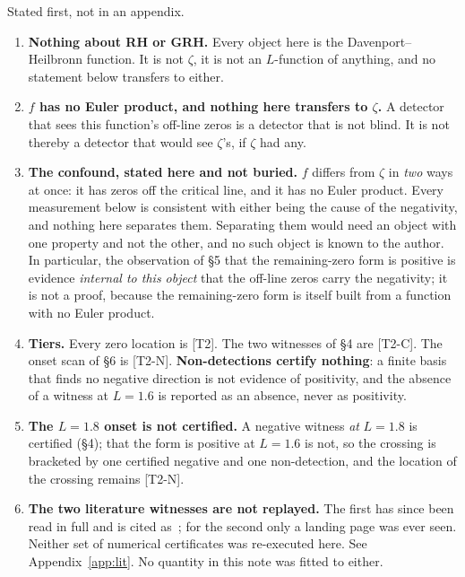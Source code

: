 \documentclass[11pt,a4paper]{article}
\theoremstyle{definition}
\theoremstyle{remark}
\newcommand{\tier}[1]{{\small\textsf{[#1]}}}
\begin{document}
Stated first, not in an appendix.

\begin{enumerate}\itemsep3pt
\item \textbf{Nothing about RH or GRH.} Every object here is the Davenport--Heilbronn
function. It is not $\zeta$, it is not an $L$-function of anything, and no statement
below transfers to either.

\item \textbf{$f$ has no Euler product, and nothing here transfers to $\zeta$.} A
detector that sees this function's off-line zeros is a detector that is not blind. It is
not thereby a detector that would see $\zeta$'s, if $\zeta$ had any.

\item \textbf{The confound, stated here and not buried.} $f$ differs from $\zeta$ in
\emph{two} ways at once: it has zeros off the critical line, and it has no Euler product.
Every measurement below is consistent with either being the cause of the negativity, and
nothing here separates them. Separating them would need an object with one property and
not the other, and no such object is known to the author. In particular, the observation
of \S5 that the remaining-zero form is positive is evidence \emph{internal to this
object} that the off-line zeros carry the negativity; it is not a proof, because the
remaining-zero form is itself built from a function with no Euler product.

\item \textbf{Tiers.} Every zero location is \tier{T2}. The two witnesses of \S4 are
\tier{T2-C}. The onset scan of \S6 is \tier{T2-N}. \textbf{Non-detections certify
nothing}: a finite basis that finds no negative direction is not evidence of positivity,
and the absence of a witness at $L=1.6$ is reported as an absence, never as positivity.

\item \textbf{The $L=1.8$ onset is not certified.} A negative witness \emph{at} $L=1.8$
is certified (\S4); that the form is positive at $L=1.6$ is not, so the crossing is
bracketed by one certified negative and one non-detection, and the location of the
crossing remains \tier{T2-N}.

\item \textbf{The two literature witnesses are not replayed.} The first has since been
read in full and is cited as~\cite{Ziad}; for the second only a landing page was ever
seen. Neither set of numerical certificates was re-executed here. See
Appendix~\ref{app:lit}. No quantity in this note was fitted to either.


\end{enumerate}
\end{document}
